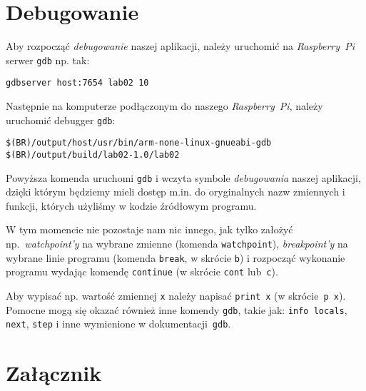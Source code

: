 \documentclass{article}
\begin{document}

\section{Debugowanie}

Aby rozpocząć \emph{debugowanie} naszej aplikacji, należy uruchomić na \emph{Raspberry~Pi} serwer \texttt{gdb} np. tak:
\begin{center}
\texttt{gdbserver host:7654 lab02 10}
\end{center}
Następnie na komputerze podłączonym do naszego \emph{Raspberry~Pi}, należy uruchomić debugger \texttt{gdb}:
\begin{center}
\texttt{\$(BR)/output/host/usr/bin/arm-none-linux-gnueabi-gdb \$(BR)/output/build/lab02-1.0/lab02}
\end{center}
Powyższa komenda uruchomi \texttt{gdb} i wczyta symbole \emph{debugowania} naszej aplikacji, dzięki którym będziemy mieli dostęp m.in. do oryginalnych nazw zmiennych i funkcji, których użyliśmy w kodzie źródłowym programu.

W tym momencie nie pozostaje nam nic innego, jak tylko założyć np.~\emph{watchpoint'y} na wybrane zmienne (komenda \texttt{watchpoint}), \emph{breakpoint'y} na wybrane linie programu (komenda \texttt{break}, w skrócie \texttt{b}) i rozpocząć wykonanie programu wydając komendę \texttt{continue} (w skrócie \texttt{cont} lub~\texttt{c}).

Aby wypisać np. wartość zmiennej \texttt{x} należy napisać \texttt{print~x} (w skrócie~\texttt{p~x}). Pomocne mogą się okazać również inne komendy \texttt{gdb}, takie jak: \texttt{info locals}, \texttt{next}, \texttt{step} i inne wymienione w dokumentacji~\texttt{gdb}.


\section{Załącznik}
\end{document}
